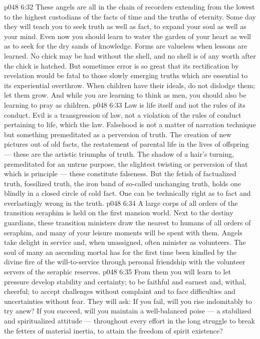 \vs p048 6:32 These angels are all in the chain of recorders extending from the lowest to the highest custodians of the facts of time and the truths of eternity. Some day they will teach you to seek truth as well as fact, to expand your soul as well as your mind. Even now you should learn to water the garden of your heart as well as to seek for the dry sands of knowledge. Forms are valueless when lessons are learned. No chick may be had without the shell, and no shell is of any worth after the chick is hatched. But sometimes error is so great that its rectification by revelation would be fatal to those slowly emerging truths which are essential to its experiential overthrow. When children have their ideals, do not dislodge them; let them grow. And while you are learning to think as men, you should also be learning to pray as children.
\vs p048 6:33 Law is life itself and not the rules of its conduct. Evil is a transgression of law, not a violation of the rules of conduct pertaining to life, which  the law. Falsehood is not a matter of narration technique but something premeditated as a perversion of truth. The creation of new pictures out of old facts, the restatement of parental life in the lives of offspring --- these are the artistic triumphs of truth. The shadow of a hair’s turning, premeditated for an untrue purpose, the slightest twisting or perversion of that which is principle --- these constitute falseness. But the fetish of factualized truth, fossilized truth, the iron band of so\hyp{}called unchanging truth, holds one blindly in a closed circle of cold fact. One can be technically right as to fact and everlastingly wrong in the truth.
\vs p048 6:34 \bibnobreakspace {} A large corps of all orders of the transition seraphim is held on the first mansion world. Next to the destiny guardians, these transition ministers draw the nearest to humans of all orders of seraphim, and many of your leisure moments will be spent with them. Angels take delight in service and, when unassigned, often minister as volunteers. The soul of many an ascending mortal has for the first time been kindled by the divine fire of the will\hyp{}to\hyp{}service through personal friendship with the volunteer servers of the seraphic reserves.
\vs p048 6:35 From them you will learn to let pressure develop stability and certainty; to be faithful and earnest and, withal, cheerful; to accept challenges without complaint and to face difficulties and uncertainties without fear. They will ask: If you fail, will you rise indomitably to try anew? If you succeed, will you maintain a well\hyp{}balanced poise --- a stabilized and spiritualized attitude --- throughout every effort in the long struggle to break the fetters of material inertia, to attain the freedom of spirit existence?
